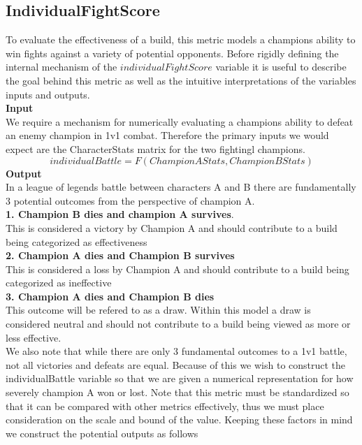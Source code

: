 \documentclass{article}
\begin{document}
\subsection{IndividualFightScore} 
To evaluate the effectiveness of a build, this metric models a champions ability to win fights against a variety of potential opponents.  Before rigidly defining the internal mechanism of the $individualFightScore$ variable it is useful to describe the goal behind this metric as well as the intuitive interpretations of the variables inputs and outputs.  \\
{\bf{Input}}\\
We require a mechanism for numerically evaluating a champions ability to defeat an enemy champion in 1v1 combat.  Therefore the primary inputs we would expect are the CharacterStats matrix for the two fightingl champions.  
\begin{equation}
individualBattle = F(ChampionAStats, ChampionBStats)
\end{equation}
{\bf{Output}}\\
In a league of legends battle between characters A and B there are fundamentally 3 potential outcomes from the perspective of champion A. \\
{\bf{1.  Champion B dies and champion A survives}}. \\
 This is considered a victory by  Champion A and should contribute to a build being categorized as effectiveness\\
{\bf{2.  Champion A dies and Champion B survives}}\\
This is considered a loss by Champion A and should contribute to a build being categorized as ineffective\\
{\bf{3.  Champion A dies and Champion B dies}} \\  This outcome will be refered to as a draw.  Within this model a draw is considered neutral and should not contribute to a build being viewed as more or less effective.\\
We also note that while there are only 3 fundamental outcomes to a 1v1 battle, not all victories and defeats are equal.  Because of this we wish to construct the individualBattle variable so that we are given a numerical representation for how severely champion A won or lost.    Note that this metric must be standardized so that it can be compared with other metrics effectively, thus we must place consideration on the scale and bound of the value.  Keeping these factors in mind we construct the potential outputs as follows\\
\end{document}
